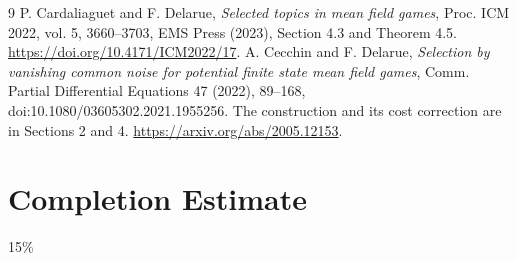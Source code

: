 \documentclass[11pt]{article}
\begin{document}
\begin{thebibliography}{9}
 P. Cardaliaguet and F. Delarue, \emph{Selected topics in mean field games}, Proc. ICM 2022, vol. 5, 3660--3703, EMS Press (2023), Section 4.3 and Theorem 4.5. \url{https://doi.org/10.4171/ICM2022/17}.
 A. Cecchin and F. Delarue, \emph{Selection by vanishing common noise for potential finite state mean field games}, Comm. Partial Differential Equations 47 (2022), 89--168, doi:10.1080/03605302.2021.1955256. The construction and its cost correction are in Sections 2 and 4. \url{https://arxiv.org/abs/2005.12153}.
\end{thebibliography}

\section{Completion Estimate}
15\%
\end{document}
